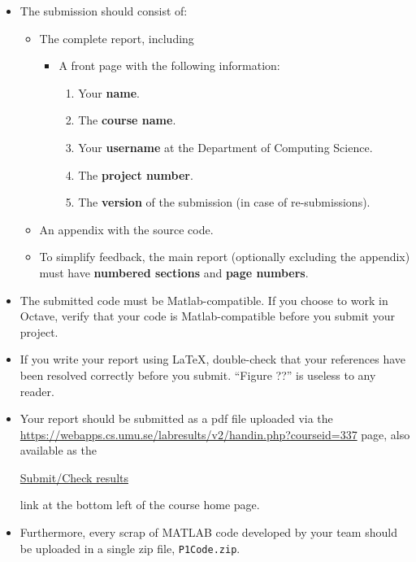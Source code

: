 \documentclass[a4paper,12pt]{article}
\begin{document}
  {%
\begin{itemize}
\item The submission should consist of:
  \begin{itemize}
  \item The complete report, including
    \begin{itemize}
    \item A front page with the following information:
      \begin{enumerate}
      \item Your {\bf name}.
      \item The {\bf course name}.
      \item Your {\bf username} at the Department of Computing
        Science.
      \item The {\bf project number}.
      \item The {\bf version} of the submission (in case of re-submissions).
      \end{enumerate}
    \end{itemize}
  \item An appendix with the source code.
  \item To simplify feedback, the main report (optionally excluding
    the appendix) must have {\bf numbered sections} and {\bf page
      numbers}.
  \end{itemize}
\item The submitted code must be Matlab-compatible. If you choose to
  work in Octave, verify that your code is Matlab-compatible before
  you submit your project.
\item If you write your report using \LaTeX, double-check that your
  references have been resolved correctly before you submit. ``Figure ??'' is useless to any reader.
\item Your report should be submitted as a pdf file uploaded via
  the\linebreak 
  \href{https://webapps.cs.umu.se/labresults/v2/handin.php?courseid=337}{https://webapps.cs.umu.se/labresults/v2/handin.php?courseid=337}
  page, also available as the
\begin{center}
  \href{http://www8.cs.umu.se/kurser/5DV005/HT18/index2.html}{Submit/Check results}
\end{center} link at the bottom left of the course home page.
\item Furthermore, every scrap of MATLAB code developed by your team should be uploaded in a single zip file, {\tt P1Code.zip}.
\end{itemize}
  }
  \vfill
\end{document}
